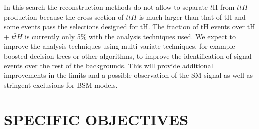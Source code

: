 \documentclass[final,3p]{CSP}
\begin{document}

In this search the reconstruction methods do not allow to separate $t$H from $t\bar{t}H$ production because the cross-section of $t\bar{t}H$ is much larger than that of tH and some events pass the selections designed for tH.
The fraction of tH events over tH + $t\bar{t}H$ is currently only 5$\%$ with the analysis techniques used.
We expect to improve the analysis techniques using multi-variate techniques, for example boosted decision trees or other algorithms, to improve the identification of signal events over the rest of the backgrounds.
This will provide additional improvements in the limits and a possible observation of the SM signal as well as stringent exclusions for BSM models.
\fi

\section{SPECIFIC OBJECTIVES}

\onehalfspacing 

\end{document}
